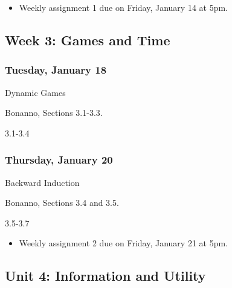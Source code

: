 \documentclass[
]{article}
\providecommand{\tightlist}{%
  \setlength{\itemsep}{0pt}\setlength{\parskip}{0pt}}
\begin{document}
\begin{itemize}
\tightlist
\item
  Weekly assignment 1 due on Friday, January 14 at 5pm.
\end{itemize}

\hypertarget{week-3-games-and-time}{%
\subsection{Week 3: Games and Time}\label{week-3-games-and-time}}

\begin{multicols}{2}

\hypertarget{tuesday-january-18}{%
\subsubsection{Tuesday, January 18}\label{tuesday-january-18}}

\begin{description}
\tightlist
\item[Topic]
Dynamic Games
\item[Reading]
Bonanno, Sections 3.1-3.3.
\item[Video lectures]
3.1-3.4
\end{description}

\hypertarget{thursday-january-20}{%
\subsubsection{Thursday, January 20}\label{thursday-january-20}}

\begin{description}
\tightlist
\item[Topic]
Backward Induction
\item[Reading]
Bonanno, Sections 3.4 and 3.5.
\item[Video lectures]
3.5-3.7
\end{description}

\end{multicols}

\begin{itemize}
\tightlist
\item
  Weekly assignment 2 due on Friday, January 21 at 5pm.
\end{itemize}

\newpage

\hypertarget{unit-4-information-and-utility}{%
\subsection{Unit 4: Information and
Utility}\label{unit-4-information-and-utility}}
\end{document}
